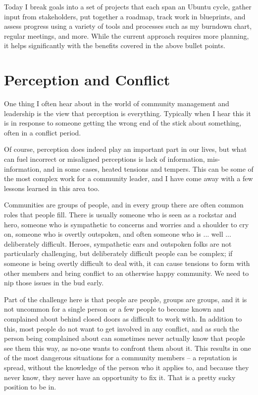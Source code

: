 Today I break goals into a set of projects that each span an Ubuntu cycle,
gather input from stakeholders, put together a roadmap, track work in
blueprints, and assess progress using a variety of tools and processes such as
my burndown chart, regular meetings, and more. While the current approach
requires more planning, it helps significantly with the benefits covered in the
above bullet points.

\section*{Perception and Conflict}

One thing I often hear about in the world of community management and leadership
is the view that perception is everything. Typically when I hear this it is in
response to someone getting the wrong end of the stick about something, often in
a conflict period.

Of course, perception does indeed play an important part in our lives, but what
can fuel incorrect or misaligned perceptions is lack of information,
mis-information, and in some cases, heated tensions and tempers. This can be
some of the most complex work for a community leader, and I have come away with
a few lessons learned in this area too.

Communities are groups of people, and in every group there are often common
roles that people fill. There is usually someone who is seen as a rockstar and
hero, someone who is sympathetic to concerns and worries and a shoulder to cry
on, someone who is overtly outspoken, and often someone who is ... well ...
deliberately difficult. Heroes, sympathetic ears and outspoken folks are not
particularly challenging, but deliberately difficult people can be complex; if
someone is being overtly difficult to deal with, it can cause tensions to form
with other members and bring conflict to an otherwise happy community. We need
to nip those issues in the bud early.

Part of the challenge here is that people are people, groups are groups, and it
is not uncommon for a single person or a few people to become known and
complained about behind closed doors as difficult to work with. In addition to
this, most people do not want to get involved in any conflict, and as such the
person being complained about can sometimes never actually know that people see
them this way, as no-one wants to confront them about it. This results in one of
the most dangerous situations for a community members -- a reputation is spread,
without the knowledge of the person who it applies to, and because they never
know, they never have an opportunity to fix it. That is a pretty sucky position
to be in.

